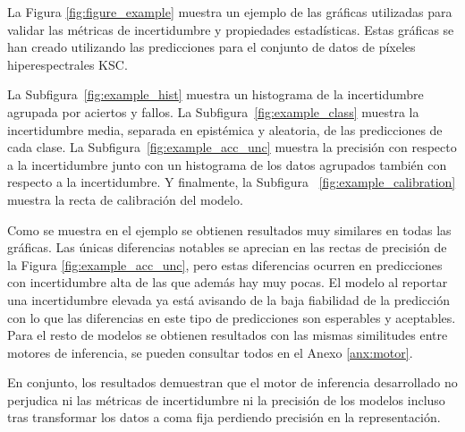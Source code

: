 La Figura \ref{fig:figure_example} muestra un ejemplo de las gráficas utilizadas para validar las métricas de incertidumbre y propiedades estadísticas. Estas gráficas se han creado utilizando las predicciones para el conjunto de datos de píxeles hiperespectrales KSC.

La Subfigura~\ref{fig:example_hist} muestra un histograma de la incertidumbre agrupada por aciertos y fallos. La Subfigura~\ref{fig:example_class} muestra la incertidumbre media, separada en epistémica y aleatoria, de las predicciones de cada clase. La Subfigura~\ref{fig:example_acc_unc} muestra la precisión con respecto a la incertidumbre junto con un histograma de los datos agrupados también con respecto a la incertidumbre. Y finalmente, la Subfigura~ \ref{fig:example_calibration} muestra la recta de calibración del modelo.

Como se muestra en el ejemplo se obtienen resultados muy similares en todas las gráficas. Las únicas diferencias notables se aprecian en las rectas de precisión de la Figura \ref{fig:example_acc_unc}, pero estas diferencias ocurren en predicciones con incertidumbre alta de las que además hay muy pocas. El modelo al reportar una incertidumbre elevada ya está avisando de la baja fiabilidad de la predicción con lo que las diferencias en este tipo de predicciones son esperables y aceptables. Para el resto de modelos se obtienen resultados con las mismas similitudes entre motores de inferencia, se pueden consultar todos en el Anexo \ref{anx:motor}.

En conjunto, los resultados demuestran que el motor de inferencia desarrollado no perjudica ni las métricas de incertidumbre ni la precisión de los modelos incluso tras transformar los datos a coma fija perdiendo precisión en la representación.

